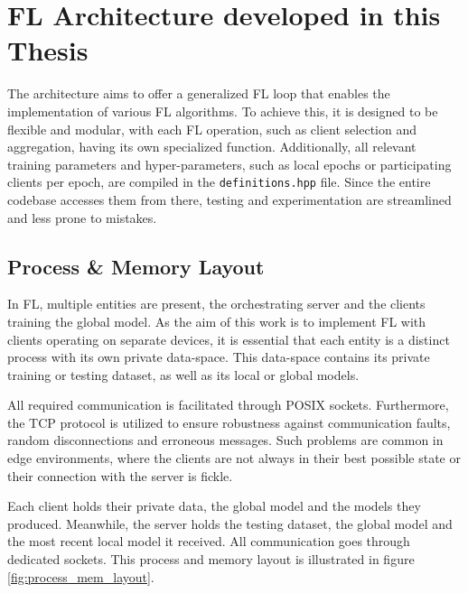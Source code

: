\section{FL Architecture developed in this Thesis}\label{sec:FL_architecture}
\label{sec:fl_architecture}
The architecture aims to offer a generalized FL loop that enables the implementation of various FL algorithms. To achieve this, it is designed to be flexible and modular, with each FL operation, such as client selection and aggregation, having its own specialized function. Additionally, all relevant training parameters and hyper-parameters, such as local epochs or participating clients per epoch, are compiled in the \texttt{definitions.hpp} file. Since the entire codebase accesses them from there, testing and experimentation are streamlined and less prone to mistakes.

\subsection{Process \& Memory Layout}
In FL, multiple entities are present, the orchestrating server and the clients training the global model. As the aim of this work is to implement FL with clients operating on separate devices, it is essential that each entity is a distinct process with its own private data-space. This data-space contains its private training or testing dataset, as well as its local or global models. %

All required communication is facilitated through POSIX sockets. Furthermore, the TCP protocol is utilized to ensure robustness against communication faults, random disconnections and erroneous messages. Such problems are common in edge environments, where the clients are not always in their best possible state or their connection with the server is fickle. %

Each client holds their private data, the global model and the models they produced. Meanwhile, the server holds the testing dataset, the global model and the most recent local model it received. All communication goes through dedicated sockets. This process and memory layout is illustrated in figure \ref{fig:process_mem_layout}. %

